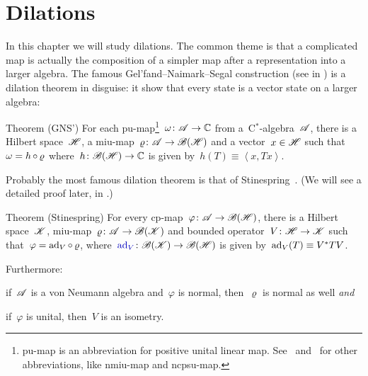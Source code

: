 
\chapter{Dilations}\label{chapter1}

\begin{parsec}%
\begin{point}%
In this chapter we will study dilations.
The common theme is that a complicated map
    is actually the composition of a simpler map
    after a representation into a larger algebra.
    The famous Gel'fand--Naimark--Segal construction (see 
        in \cite{bram})
    is a dilation theorem in disguise:
    it show that every state is a vector state on a larger algebra:
\end{point}
\begin{point}{Theorem (GNS')}%
    For each pu-map\footnote{%
        pu-map is an abbreviation for positive unital linear map.
        See~ and~
            for other abbreviations, like nmiu-map
            and ncpsu-map.
        }~$\omega\colon \mathscr{A} \to \mathbb{C}$
        from a~C$^*$-algebra~$\mathscr{A}$,
    there is a Hilbert space~$\mathscr{H}$,
    a miu-map~$\varrho\colon \mathscr{A} \to \mathscr{B}(\mathscr{H})$
    and a vector~$x \in \mathscr{H}$
    such that~$\omega = h \mathop{\circ} \varrho$
    where~$h \colon \mathscr{B}(\mathscr{H}) \to \mathbb{C}$
    is given by~$h(T) \equiv \left<x,Tx\right>$.
\end{point}

\begin{point}%
Probably the most famous dilation theorem is that
of Stinespring~\cite[Thm.~1]{stinespring}.
(We will see a detailed proof later, in .)
\end{point}

\begin{point}{Theorem (Stinespring)}
    For every cp-map~$\varphi\colon \mathscr{A} \to \mathscr{B} (\mathscr{H})$,
    there is a Hilbert space~$\mathscr{K}$,
        miu-map~$\varrho\colon \mathscr{A} \to \mathscr{B}(\mathscr{K})$
        and bounded operator~$V\colon \mathscr{H} \to \mathscr{K}$
        such that~$\varphi = \mathrm{ad}_V \mathop{\circ} \varrho$,
        where~$\Define{\ad_V}\index{$\ad_V$!Hilbert spaces} \colon \scrB(\scrK) \to \scrB(\scrH)$
        is given by~$\mathrm{ad}_V(T)\equiv V^*TV$.

Furthermore:
\begin{inparaenum}
\item
    if~$\mathscr{A}$ is a von Neumann algebra
    and~$\varphi$ is normal, then~$\varrho$ is normal as well \emph{and}
\item
    if~$\varphi$ is unital, then~$V$ is an isometry.
\end{inparaenum}
\end{point}


\end{parsec}
